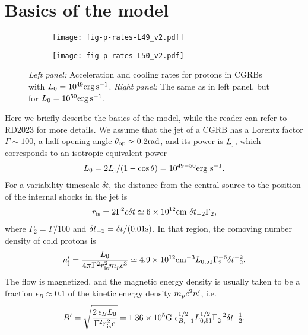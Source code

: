 \documentclass[baaa]{baaa}
\newcommand{\be}{\begin{eqnarray}}
\newcommand{\ee}{\end{eqnarray}}
\begin{document}
\section{Basics of the model}
%
\begin{figure*}[!h]
\centering
    \begin{subfigure}[t]{0.48\textwidth}
        \centering                          
        \texttt{[image: fig-p-rates-L49\_v2.pdf]} 
    \end{subfigure}
    \hfill
    \begin{subfigure}[t]{0.48\textwidth}
        \centering
        \texttt{[image: fig-p-rates-L50\_v2.pdf]} 
    \end{subfigure}
\caption{{\emph{Left panel:} Acceleration and cooling rates for protons in CGRBs with $L_0=10^{49}{\rm erg \, s^{-1}}$.
\emph{Right panel:} The same as in left panel, but for $L_0=10^{50}{\rm erg \, s^{-1}}$. 
 }} 
\label{fig:prates}
\end{figure*}
Here we briefly describe the basics of the model, while the reader can refer to RD2023 for more details. We assume that the jet of a CGRB has a Lorentz factor $\Gamma\sim 100$, a half-opening angle $\theta_{\rm op}\approx 0.2 {\rm rad}$, and its power is $L_{\rm j}$, which corresponds to an isotropic equivalent power 
\be 
L_{0}= 2L_{\rm j}/(1-\cos\theta)= 10^{49-50}{\rm erg \ s^{-1}}. 
\ee
For a variability timescale $\delta t$, the distance from the central source to the position of the internal shocks in the jet is
\be
r_{\rm is}= 2\Gamma^2c\delta t\simeq 6\times 10^{12}{\rm cm}\ {\delta t_{-2}} \Gamma_{2},
\ee
where $\Gamma_2=\Gamma/100$ and $\delta t_{-2}=\delta t/(0.01 {\rm s})$.
In that region, the comoving number density of cold protons is
\be
n'_{\rm j}= \frac{L_{0}}{4\pi\Gamma^2 r^2_{\rm is} m_p c^3} \simeq 4.9\times 10^{12}{\rm cm^{-3}}L_{0, 51}\Gamma_2^{-6}\delta t_{-2}^{-2}. 
\ee
The flow is magnetized, and the magnetic energy density is usually taken to be a fraction $\epsilon_{B}\approx 0.1$ of the kinetic energy density $m_p c^2 n'_{\rm j}$, i.e.
\be
B'=\sqrt{\frac{2 \,\epsilon_B L_{0}}{\Gamma^2 r^2_{\rm is}  c}}= 1.36\times 10^{5}{\rm G} \ \epsilon_{B,-1}^{{1}/{2}}L_{0,51}^{{1}/{2}} \Gamma_{2}^{-2} \delta t_{-2}^{-1}. 
\ee
\end{document}
